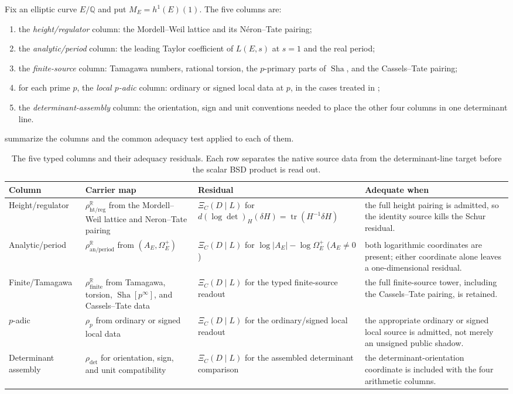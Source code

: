 \documentclass[11pt]{article}
\theoremstyle{definition}
\newcommand{\Q}{\mathbb{Q}}
\newcommand{\R}{\mathbb{R}}
\newcommand{\Sha}{\operatorname{Sha}}
\newcommand{\tr}{\operatorname{tr}}
\newcommand{\XiC}{\Xi_C(D\mid L)}        \newcommand{\KDD}{K_{DD}}
\begin{document}
Fix an elliptic curve $E/\Q$ and put $M_E=h^1(E)(1)$.  The five columns are:
\begin{enumerate}
\item the \emph{height/regulator} column: the Mordell--Weil lattice and its
  N\'eron--Tate pairing;
\item the \emph{analytic/period} column: the leading Taylor coefficient of
  $L(E,s)$ at $s=1$ and the real period;
\item the \emph{finite-source} column: Tamagawa numbers, rational torsion,
  the $p$-primary parts of $\Sha$, and the Cassels--Tate pairing;
\item for each prime $p$, the \emph{local $p$-adic} column: ordinary or
  signed local data at $p$, in the cases treated in ;
\item the \emph{determinant-assembly} column: the orientation, sign and unit
  conventions needed to place the other four columns in one determinant
  line.
\end{enumerate}
 summarize the columns
and the common adequacy test applied to each of them.
\begin{table}[tbp]
\centering
\small
\caption{The five typed columns and their adequacy residuals.  Each row
separates the native source data from the determinant-line target before the
scalar BSD product is read out.}
\label{tab:five-column-map}
\begin{tabularx}{\textwidth}{@{}>{\raggedright\arraybackslash}p{}
>{\raggedright\arraybackslash}p{}
>{\raggedright\arraybackslash}p{}
>{\raggedright\arraybackslash}X@{}}
\toprule
Column & Carrier map & Residual & Adequate when \\
\midrule
Height/regulator &
\(\rho_{\mathrm{ht/reg}}^{\R}\) from the Mordell--Weil lattice and
Neron--Tate pairing &
\(\XiC\) for \(d(\log\det)_H(\delta H)=\tr(H^{-1}\delta H)\) &
the full height pairing is admitted, so the identity source kills the Schur
residual. \\
\addlinespace
Analytic/period &
\(\rho_{\mathrm{an/period}}^{\R}\) from \((A_E,\Omega_E^+)\) &
\(\XiC\) for \(\log|A_E|-\log\Omega_E^+\) (\(A_E\neq0\)) &
both logarithmic coordinates are present; either coordinate alone leaves a
one-dimensional residual. \\
\addlinespace
Finite/Tamagawa &
\(\rho_{\mathrm{finite}}^{\R}\) from Tamagawa, torsion, \(\Sha[p^\infty]\),
and Cassels--Tate data &
\(\XiC\) for the typed finite-source readout &
the full finite-source tower, including the Cassels--Tate pairing, is
retained. \\
\addlinespace
\(p\)-adic &
\(\rho_p\) from ordinary or signed local data &
\(\XiC\) for the ordinary/signed local readout &
the appropriate ordinary or signed local source is admitted, not merely an
unsigned public shadow. \\
\addlinespace
Determinant assembly &
\(\rho_{\det}\) for orientation, sign, and unit compatibility &
\(\XiC\) for the assembled determinant comparison &
the determinant-orientation coordinate is included with the four arithmetic
columns. \\
\bottomrule
\end{tabularx}
\end{table}
\end{document}
